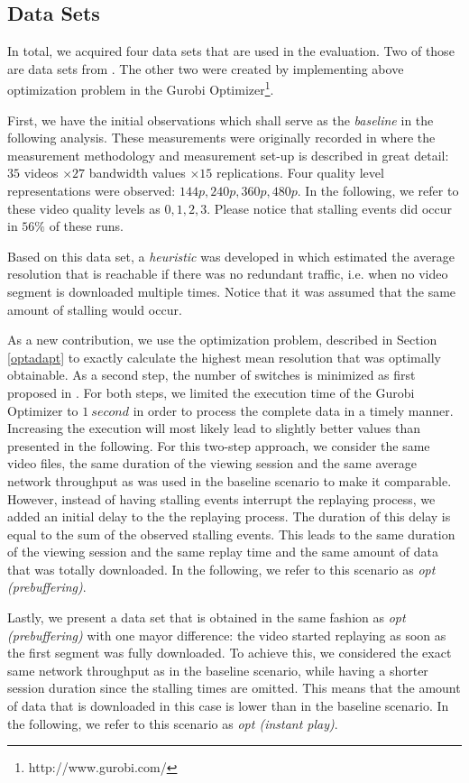 
\subsection{Data Sets}

In total, we acquired four data sets that are used in the evaluation. Two of those are data sets from \cite{sieber16sacrificing}. The other two were created by implementing above optimization problem in the Gurobi Optimizer\footnote{http://www.gurobi.com/}.

First, we have the initial observations which shall serve as the \textit{baseline} in the following analysis. These measurements were originally recorded in \cite{sieber16sacrificing} where the measurement methodology and measurement set-up is described in great detail: $35$ videos $\times 27$ bandwidth values $\times 15$ replications. Four quality level representations were observed: $144p, 240p, 360p, 480p$. In the following, we refer to these video quality levels as $0,1,2,3$. Please notice that stalling events did occur in $56\%$ of these runs.

Based on this data set, a \textit{heuristic} was developed in \cite{sieber16sacrificing} which estimated the average resolution that is reachable if there was no redundant traffic, i.e. when no video segment is downloaded multiple times. Notice that it was assumed that the same amount of stalling would occur.

As a new contribution, we use the optimization problem, described in Section \ref{optadapt} to exactly calculate the highest mean resolution that was optimally obtainable. As a second step, the number of switches is minimized as first proposed in \cite{miller2013optimal}. For both steps, we limited the execution time of the Gurobi Optimizer to $\SI{1}{second}$ in order to process the complete data in a timely manner. Increasing the execution will most likely lead to slightly better values than presented in the following. For this two-step approach, we consider the same video files, the same duration of the viewing session and the same average network throughput as was used in the baseline scenario to make it comparable. However, instead of having stalling events interrupt the replaying process, we added an initial delay to the the replaying process. The duration of this delay is equal to the sum of the observed stalling events. This leads to the same duration of the viewing session and the same replay time and the same amount of data that was totally downloaded. In the following, we refer to this scenario as \textit{opt (prebuffering)}.

Lastly, we present a data set that is obtained in the same fashion as \textit{opt (prebuffering)} with one mayor difference: the video started replaying as soon as the first segment was fully downloaded. To achieve this, we considered the exact same network throughput as in the baseline scenario, while having a shorter session duration since the stalling times are omitted. This means that the amount of data that is downloaded in this case is lower than in the baseline scenario. In the following, we refer to this scenario as \textit{opt (instant play)}.
